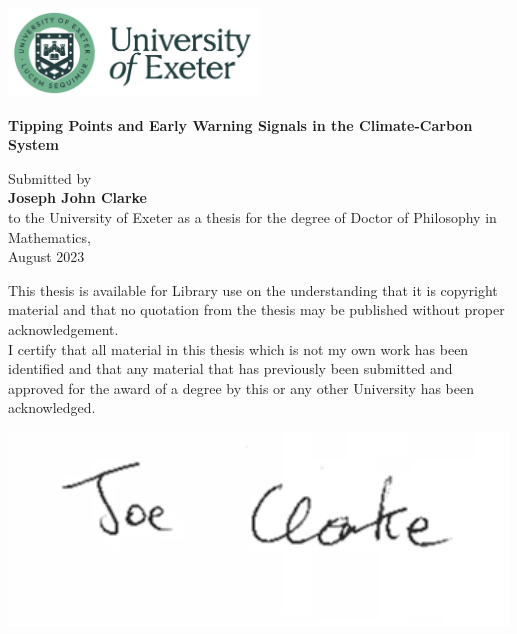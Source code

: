 \graphicspath{{figs/}}
\begin{titlepage}
  \begin{onehalfspace}
    \begin{center}
      {
        \sffamily
        \vspace{1cm}
        \includegraphics[width=0.5\textwidth]{Exeter_logo.png}
        \Huge
        
        \vspace*{1.5cm}
        \textbf{Tipping Points and Early Warning Signals in the Climate-Carbon System}
        \vspace{2cm}
        \large


        Submitted by\\
        \textbf{Joseph John Clarke}\\
        to the University of Exeter as a thesis for the degree of Doctor of Philosophy in Mathematics,\\
        August 2023

        \vspace{2cm}
        \normalsize
        This thesis is available for Library use on the understanding that it is copyright
	material and that no quotation from the thesis may be published without proper
	acknowledgement.\\
	\vspace{1cm}
	I certify that all material in this thesis which is not my own work has been identified
	and that any material that has previously been submitted and approved for the award
	of a degree by this or any other University has been acknowledged.
	
	
	\vspace{1cm}
        \includegraphics[scale=0.5]{signature}
        }
      \end{center}
    \end{onehalfspace}
  \end{titlepage}
\restoregeometry%
